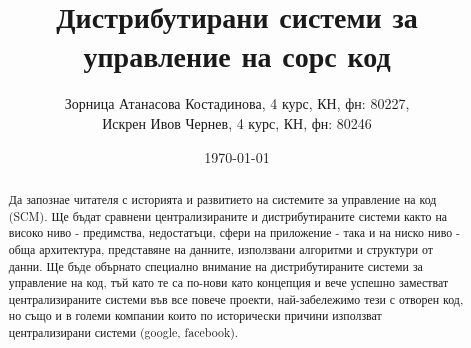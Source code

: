 \documentclass[a4paper]{article}
\def\SCM{SCM}
\begin{document}
\title{Дистрибутирани системи за управление на сорс код}
\author{
Зорница Атанасова Костадинова, 4 курс, КН, фн: 80227, \\
Искрен Ивов Чернев, 4 курс, КН, фн: 80246
}
\date{\today}
\maketitle


\begin{abstract}
Да запознае читателя с историята и развитието на системите за управление на код (\SCM). Ще бъдат сравнени централизираните и дистрибутираните системи както на високо ниво - предимства, недостатъци, сфери на приложение - така и на ниско ниво - обща архитектура, представяне на данните, използвани алгоритми и структури от данни. Ще бъде обърнато специално внимание на дистрибутираните системи за управление на код, тъй като те са по-нови като концепция и вече успешно заместват централизираните системи във все повече проекти, най-забележимо тези с отворен код, но също и в големи компании които по исторически причини използват централизирани системи (google, facebook).
\end{abstract}
\newpage

\setcounter{tocdepth}{2}
\tableofcontents
\newpage

% 
% 
% 
% 
% 
% 
% 
\end{document}
